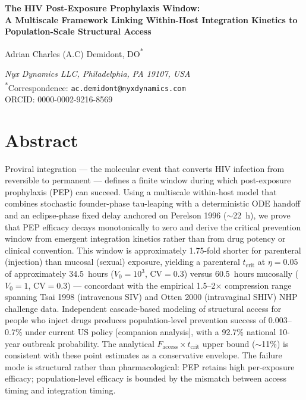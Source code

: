 \documentclass[10pt,letterpaper]{article}
\theoremstyle{definition}
\theoremstyle{remark}
\newcommand{\Faccess}{F_{\text{access}}}
\newcommand{\tcrit}{t_{\text{crit}}}
\begin{document}
\linenumbers
\vspace*{0.2in}

\begin{flushleft}

{\LARGE\bfseries The HIV Post-Exposure Prophylaxis Window:\\[0.3em]
A Multiscale Framework Linking Within-Host Integration Kinetics to Population-Scale Structural Access\par}
\vspace{1em}

{\large Adrian Charles (A.C) Demidont, DO\textsuperscript{*}\par}
\vspace{0.5em}
\textit{Nyx Dynamics LLC, Philadelphia, PA 19107, USA}\\[0.3em]
\textsuperscript{*}Correspondence: \texttt{ac.demidont@nyxdynamics.com} \\
ORCID: 0000-0002-9216-8569
\end{flushleft}
\section*{Abstract}
Proviral integration --- the molecular event that converts HIV infection from reversible to permanent --- defines a finite window during which post-exposure prophylaxis (PEP) can succeed. Using a multiscale within-host model that combines stochastic founder-phase tau-leaping with a deterministic ODE handoff and an eclipse-phase fixed delay anchored on Perelson 1996 ($\sim$22~h), we prove that PEP efficacy decays monotonically to zero and derive the critical prevention window from emergent integration kinetics rather than from drug potency or clinical convention. This window is approximately 1.75-fold shorter for parenteral (injection) than mucosal (sexual) exposure, yielding a parenteral $\tcrit$ at $\eta = 0.05$ of approximately 34.5~hours ($V_{0} = 10^{3}$, CV$=0.3$) versus 60.5~hours mucosally ($V_{0} = 1$, CV$=0.3$) --- concordant with the empirical 1.5--2$\times$ compression range spanning Tsai 1998 (intravenous SIV) and Otten 2000 (intravaginal SHIV) NHP challenge data. Independent cascade-based modeling of structural access for people who inject drugs produces population-level prevention success of 0.003--0.7\% under current US policy [companion analysis], with a 92.7\% national 10-year outbreak probability. The analytical $\Faccess \times \tcrit$ upper bound ($\sim$11\%) is consistent with these point estimates as a conservative envelope. The failure mode is structural rather than pharmacological: PEP retains high per-exposure efficacy; population-level efficacy is bounded by the mismatch between access timing and integration timing.
\end{document}
